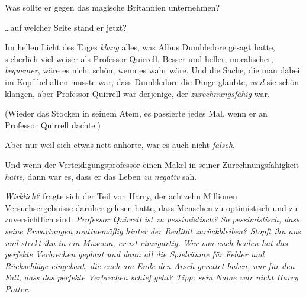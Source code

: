 Was sollte er gegen das magische Britannien unternehmen?

…auf welcher Seite stand er jetzt?

Im hellen Licht des Tages \emph{klang} alles, was Albus Dumbledore gesagt hatte, sicherlich viel weiser als Professor Quirrell. Besser und heller, moralischer, \emph{bequemer}, wäre es nicht schön, wenn es wahr wäre. Und die Sache, die man dabei im Kopf behalten musste war, dass Dumbledore die Dinge glaubte, \emph{weil} sie schön klangen, aber Professor Quirrell war derjenige, der \emph{zurechnungsfähig} war.

(Wieder das Stocken in seinem Atem, es passierte jedes Mal, wenn er an Professor Quirrell dachte.)

Aber nur weil sich etwas nett anhörte, war es auch nicht \emph{falsch}.

Und wenn der Verteidigungsprofessor einen Makel in seiner Zurechnungsfähigkeit \emph{hatte}, dann war es, dass er das Leben \emph{zu negativ} sah.

\emph{Wirklich?} fragte sich der Teil von Harry, der achtzehn Millionen Versuchsergebnisse darüber gelesen hatte, dass Menschen zu optimistisch und zu zuversichtlich sind. \emph{Professor Quirrell ist zu pessimistisch? So pessimistisch, dass seine Erwartungen routinemäßig hinter der Realität \emph{zurückbleiben}? Stopft ihn aus und steckt ihn in ein Museum, er ist einzigartig. Wer von euch beiden hat das perfekte Verbrechen geplant und \emph{dann} all die Spielräume für Fehler und Rückschläge eingebaut, die euch am Ende den Arsch gerettet haben, nur für den Fall, dass das perfekte Verbrechen schief geht? Tipp: sein Name war nicht Harry Potter.}

